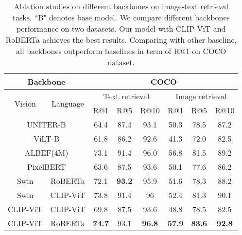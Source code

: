 \documentclass{article}
\begin{document}
\begin{table}[]
\centering
\caption{Ablation studies on different backbones on image-text retrieval tasks. ``B" denotes base model. We compare different backbones performance on two datasets. Our model with CLIP-ViT and RoBERTa achieves the best results. Comparing with other baseline, all backbones outperform baselines in term of R@1 on COCO dataset.} \label{retrieval}
\begin{tabular}{cc|cccccc}
\hline
\multicolumn{2}{c|}{Backbone}                       & \multicolumn{6}{c}{COCO}                                                                                                                                      \\ \hline
\multirow{2}{*}{Vision} & \multirow{2}{*}{Language} & \multicolumn{3}{c}{Text retrieval}            & \multicolumn{3}{c}{Image retrieval}                     \\
                        &                           & R@1           & R@5           & R@10          & R@1           & R@5           & R@10                   \\ \hline
\multicolumn{2}{c|}{UNITER-B}                       & 64.4          & 87.4          & 93.1          & 50.3          & 78.5          & 87.2                   \\
\multicolumn{2}{c|}{ViLT-B}                         & 61.8          & 86.2          & 92.6          & 41.3          & 72.0          & 82.5                   \\
\multicolumn{2}{c|}{ALBEF(4M)}                      & 73.1          & 91.4          & 96.0          & 56.8          & 81.5          & 89.2                    \\
\multicolumn{2}{c|}{PixelBERT}                      & 63.6          & 87.5          & 93.6          & 50.1          & 77.6          & 86.2                    \\ \hline
Swin                    & RoBERTa                   & 72.1          & \textbf{93.2} & 95.9          & 51.6          & 78.3          & 88.2                    \\
Swin                    & CLIP-ViT                  & 73.8          & 91.4          & 96            & 52.4          & 81.3          & 90.1                    \\
CLIP-ViT                & CLIP-ViT                  & 69.8          & 87.5          & 93.6          & 48.8          & 78.5          & 82.5                    \\
CLIP-ViT                & RoBERTa                   & \textbf{74.7} & 93.1          & \textbf{96.8} & \textbf{57.9} & \textbf{83.6} & \textbf{92.8} \\ \hline
\end{tabular}
\end{table}
\end{document}
